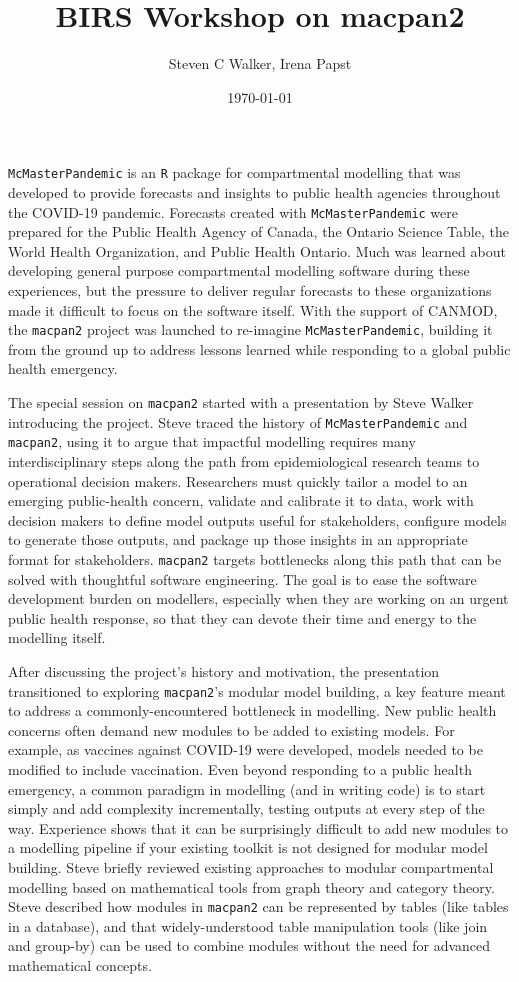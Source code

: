 \documentclass{article}
\title{BIRS Workshop on macpan2}
\date{\today}
\author{Steven C Walker, Irena Papst}
\newcommand{\macpan}{\texttt{macpan2}\xspace}
\newcommand{\macpanOrig}{\texttt{McMasterPandemic}\xspace}
\newcommand{\R}{\texttt{R}\xspace}
\begin{document}
  \maketitle

  \macpanOrig is an \R package for compartmental modelling that was developed to provide forecasts and insights to public health agencies throughout the COVID-19 pandemic. Forecasts created with \macpanOrig were prepared for the Public Health Agency of Canada, the Ontario Science Table, the World Health Organization, and Public Health Ontario. Much was learned about developing general purpose compartmental modelling software during these experiences, but the pressure to deliver regular forecasts to these organizations made it difficult to focus on the software itself. With the support of CANMOD, the \macpan project was launched to re-imagine \macpanOrig, building it from the ground up to address lessons learned while responding to a global public health emergency.

  The special session on \macpan started with a presentation by Steve Walker introducing the project. Steve traced the history of \macpanOrig and \macpan, using it to argue that impactful modelling requires many interdisciplinary steps along the path from epidemiological research teams to operational decision makers. Researchers must quickly tailor a model to an emerging public-health concern, validate and calibrate it to data, work with decision makers to define model outputs useful for stakeholders, configure models to generate those outputs, and package up those insights in an appropriate format for stakeholders. \macpan targets bottlenecks along this path that can be solved with thoughtful software engineering. The goal is to ease the software development burden on modellers, especially when they are working on an urgent public health response, so that they can devote their time and energy to the modelling itself.

  After discussing the project's history and motivation, the presentation transitioned to exploring \macpan's modular model building, a key feature meant to address a commonly-encountered bottleneck in modelling. New public health concerns often demand new modules to be added to existing models. For example, as vaccines against COVID-19 were developed, models needed to be modified to include vaccination. Even beyond responding to a public health emergency, a common paradigm in modelling (and in writing code) is to start simply and add complexity incrementally, testing outputs at every step of the way. Experience shows that it can be surprisingly difficult to add new modules to a modelling pipeline if your existing toolkit is not designed for modular model building. Steve briefly reviewed existing approaches to modular compartmental modelling based on mathematical tools from graph theory and category theory. Steve described how modules in \macpan can be represented by tables (like tables in a database), and that widely-understood table manipulation tools (like join and group-by) can be used to combine modules without the need for advanced mathematical concepts.
\end{document}
